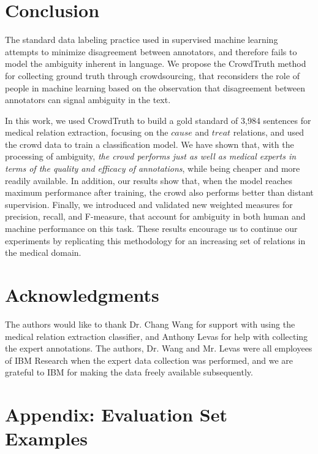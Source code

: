\section{Conclusion}

The standard data labeling practice used in supervised machine learning attempts to minimize disagreement between annotators, and therefore fails to model the ambiguity inherent in language. We propose the CrowdTruth method for collecting ground truth through crowdsourcing, that reconsiders the role of people in machine learning based on the observation that disagreement between annotators can signal ambiguity in the text.

In this work, we used CrowdTruth to build a gold standard of 3,984 sentences for medical relation extraction, focusing on the $cause$ and $treat$ relations, and used the crowd data to train a classification model. We have shown that, with the processing of ambiguity, \textit{the crowd performs just as well as medical experts in terms of the quality and efficacy of annotations}, while being cheaper and more readily available. In addition, our results show that, when the model reaches maximum performance after training, the crowd also performs better than distant supervision. Finally, we introduced and validated new weighted measures for precision, recall, and F-measure, that account for ambiguity in both human and machine performance on this task. These results encourage us to continue our experiments by replicating this methodology for an increasing set of relations in the medical domain.


\section*{Acknowledgments}

The authors would like to thank Dr. Chang Wang for support with using the medical relation extraction classifier, and Anthony Levas for help with collecting the expert annotations.  The authors, Dr. Wang and Mr. Levas were all employees of IBM Research when the expert data collection was performed, and we are grateful to IBM for making the data freely available subsequently.


\section{Appendix: Evaluation Set Examples}

